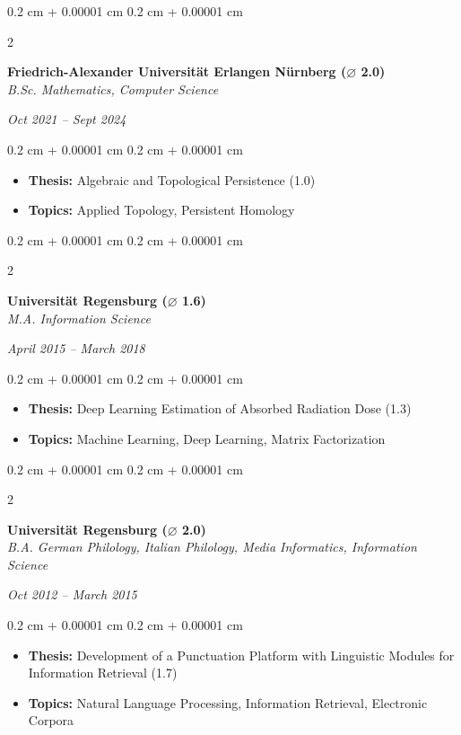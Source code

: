 \documentclass[10pt, letterpaper]{article}
\newenvironment{highlights}{
    \begin{itemize}[
        topsep=0.10 cm,
        parsep=0.10 cm,
        partopsep=0pt,
        itemsep=0pt,
        leftmargin=0.4 cm + 10pt
    ]
}{
    \end{itemize}
}
\newenvironment{onecolentry}{
    \begin{adjustwidth}{
        0.2 cm + 0.00001 cm
    }{
        0.2 cm + 0.00001 cm
    }
}{
    \end{adjustwidth}
}
\newenvironment{twocolentry}[2][]{
    \onecolentry
    \def\secondColumn{#2}
    \setcolumnwidth{\fill, 4.5 cm}
    \begin{paracol}{2}
}{
    \switchcolumn \raggedleft \secondColumn
    \end{paracol}
    \endonecolentry
}
\begin{document}
\vspace{0.10 cm}
\begin{twocolentry}{           
	\textit{Oct 2021 – Sept 2024}}
	\textbf{Friedrich-Alexander Universität Erlangen Nürnberg  ($\varnothing$ 2.0)} \\
	\textit{B.Sc. Mathematics, Computer Science}
\end{twocolentry}
\vspace{0.10 cm}
\begin{onecolentry}
	\begin{highlights}
		\item \textbf{Thesis:} Algebraic and Topological Persistence (1.0)
		\item \textbf{Topics:} Applied Topology, Persistent Homology
	\end{highlights}
\end{onecolentry}

\vspace{0.10 cm}
\begin{twocolentry}{           
	\textit{April 2015 – March 2018}}
	\textbf{Universität Regensburg  ($\varnothing$ 1.6)} \\
	\textit{M.A. Information Science}
\end{twocolentry}
\vspace{0.10 cm}
\begin{onecolentry}
	\begin{highlights}
		\item \textbf{Thesis:} Deep Learning Estimation of Absorbed Radiation Dose (1.3)
		\item \textbf{Topics:} Machine Learning, Deep Learning, Matrix Factorization
	\end{highlights}
\end{onecolentry}

\vspace{0.10 cm}
\begin{twocolentry}{           
	\textit{Oct 2012 – March 2015}}
	\textbf{Universität Regensburg  ($\varnothing$ 2.0)} \\
	\textit{B.A. German Philology, Italian Philology, Media Informatics, Information Science}
\end{twocolentry}
\vspace{0.10 cm}
\begin{onecolentry}
	\begin{highlights}
		\item \textbf{Thesis:} Development of a Punctuation Platform with Linguistic Modules for Information Retrieval (1.7)
		\item \textbf{Topics:} Natural Language Processing, Information Retrieval, Electronic Corpora
	\end{highlights}
\end{onecolentry}
\end{document}
